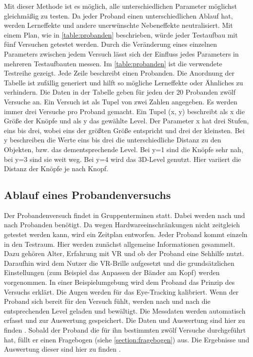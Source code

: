 Mit dieser Methode ist es möglich, alle unterschiedlichen Parameter möglichst gleichmäßig zu testen. Da jeder Proband einen unterschiedlichen Ablauf hat, werden Lerneffekte und andere unerwünschte Nebeneffekte neutralisiert. Mit einem Plan, wie in \autoref{table:probanden} beschrieben, würde jeder Testaufbau mit fünf Versuchen getestet werden. Durch die Veränderung eines einzelnen Parameters zwischen jedem Versuch lässt sich der Einfluss jedes Parameters in mehreren Testaufbauten messen. Im \autoref{table:probanden} ist die verwendete Testreihe gezeigt. Jede Zeile beschreibt einen Probanden. Die Anordnung der Tabelle ist zufällig generiert und hilft so mögliche Lerneffekte oder Ähnliches zu verhindern. Die Daten in der Tabelle geben für jeden der 20 Probanden zwölf Versuche an. Ein Versuch ist als Tupel von zwei Zahlen angegeben. Es werden immer drei Versuche pro Proband gemacht. Ein Tupel (x, y) beschreibt als x die Größe der Knöpfe und als y das gewählte Level. Der Parameter x hat drei Stufen, eins bis drei, wobei eins der größten Größe entspricht und drei der kleinsten. Bei y beschreiben die Werte eins bis drei die unterschiedliche Distanz zu den Objekten, bzw. das dementsprechende Level. Bei y=1 sind die Knöpfe sehr nah, bei y=3 sind sie weit weg. Bei y=4 wird das 3D-Level genutzt. Hier variiert die Distanz der Knöpfe je nach Knopf. 

\subsection{Ablauf eines Probandenversuchs}
Der Probandenversuch findet in Gruppenterminen statt. Dabei werden nach und nach Probanden benötigt. Da wegen Hardwareeinschränkungen nicht zeitgleich getestet werden kann, wird ein Zeitplan entworfen. Jeder Proband kommt einzeln in den Testraum. Hier werden zunächst allgemeine Informationen gesammelt. Dazu gehören Alter, Erfahrung mit VR und ob der Proband eine Sehhilfe nutzt. Daraufhin wird dem Nutzer die VR-Brille aufgesetzt und die grundsätzlichen Einstellungen (zum Beispiel das Anpassen der Bänder am Kopf) werden vorgenommen. In einer Beispielumgebung wird dem Proband das Prinzip des Versuchs erklärt. Die Augen werden für das Eye-Tracking kalibriert. Wenn der Proband sich bereit für den Versuch fühlt, werden nach und nach die entsprechenden Level geladen und bewältigt. Die Messdaten werden automatisch erfasst und zur Auswertung gespeichert. Die Daten und Auswertung sind hier zu finden . Sobald der Proband die für ihn bestimmten zwölf Versuche durchgeführt hat, füllt er einen Fragebogen (siehe \autoref{section:fragebogen}) aus. Die Ergebnisse und Auswertung dieser sind hier zu finden .

